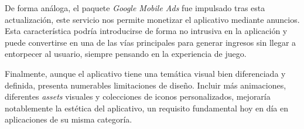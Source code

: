 De forma análoga, el paquete \textit{Google Mobile Ads} fue impulsado tras esta actualización,
este servicio nos permite monetizar el aplicativo mediante anuncios. Esta característica
podría introducirse de forma no intrusiva en la aplicación y puede convertirse en una de las vías principales para generar ingresos sin
llegar a entorpecer al usuario, siempre pensando en la experiencia de juego.

Finalmente, aunque el aplicativo tiene una temática visual bien diferenciada y
definida, presenta numerables limitaciones de diseño. Incluir más animaciones, diferentes \textit{assets} visuales y
colecciones de iconos personalizados, mejoraría notablemente la estética del aplicativo, un requisito
fundamental hoy en día en aplicaciones de su misma categoría.